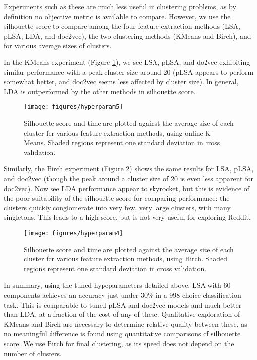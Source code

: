 \documentclass[]{article}
\begin{document}
Experiments such as these are much less useful in clustering problems, as by definition no objective metric is available to compare. However, we use the silhouette score to compare among the four feature extraction methods (LSA, pLSA, LDA, and doc2vec), the two clustering methods (KMeans and Birch), and for various average sizes of clusters.

In the KMeans experiment (Figure \ref{fig:kmeans}), we see LSA, pLSA, and do2vec exhibiting similar performance with a peak cluster size around 20 (pLSA appears to perform somewhat better, and doc2vec seems less affected by cluster size). In general, LDA is outperformed by the other methods in silhouette score.
	\begin{figure}[htbp!]
		\centering
		\texttt{[image: figures/hyperparam5]}
		\caption{Silhouette score and time are plotted against the average size of each cluster for various feature extraction methods, using online K-Means. Shaded regions represent one standard deviation in cross validation.}
		\label{fig:kmeans}
	\end{figure}
	
Similarly, the Birch experiment (Figure \ref{fig:birch}) shows the same results for LSA, pLSA, and doc2vec (though the peak around a cluster size of 20 is even less apparent for doc2vec). Now see LDA performance appear to skyrocket, but this is evidence of the poor suitability of the silhouette score for comparing performance: the clusters quickly conglomerate into very few, very large clusters, with many singletons. This leads to a high score, but is not very useful for exploring Reddit.
	
	\begin{figure}[htbp!]
		\centering
		\texttt{[image: figures/hyperparam4]}
		\caption{Silhouette score and time are plotted against the average size of each cluster for various feature extraction methods, using Birch. Shaded regions represent one standard deviation in cross validation.}
		\label{fig:birch}
	\end{figure}
	
In summary, using the tuned hypeparameters detailed above, LSA with 60 components achieves an accuracy just under 30\% in a 998-choice classification task. This is comparable to tuned pLSA and doc2vec models and much better than LDA, at a fraction of the cost of any of these. Qualitative exploration of KMeans and Birch are necessary to determine relative quality between these, as no meaningful difference is found using quantitative comparisons of silhouette score. We use Birch for final clustering, as its speed does not depend on the number of clusters.
\end{document}
